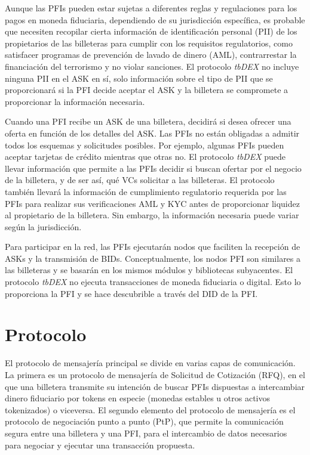 \documentclass[11pt]{article}
\begin{document}
\vspace{1\baselineskip}
Aunque las PFIs pueden estar sujetas a diferentes reglas y regulaciones para los pagos en moneda fiduciaria, dependiendo de su jurisdicción específica, es probable que necesiten recopilar cierta información de identificación personal (PII) de los propietarios de las billeteras para cumplir con los requisitos regulatorios, como satisfacer programas de prevención de lavado de dinero (AML), contrarrestar la financiación del terrorismo y no violar sanciones. El protocolo \textit{tbDEX} no incluye ninguna PII en el ASK en sí, solo información sobre el tipo de PII que se proporcionará si la PFI decide aceptar el ASK y la billetera se compromete a proporcionar la información necesaria.

\vspace{1\baselineskip}
Cuando una PFI recibe un ASK de una billetera, decidirá si desea ofrecer una oferta en función de los detalles del ASK. Las PFIs no están obligadas a admitir todos los esquemas y solicitudes posibles. Por ejemplo, algunas PFIs pueden aceptar tarjetas de crédito mientras que otras no. El protocolo \textit{tbDEX} puede llevar información que permite a las PFIs decidir si buscan ofertar por el negocio de la billetera, y de ser así, qué VCs solicitar a las billeteras. El protocolo también llevará la información de cumplimiento regulatorio requerida por las PFIs para realizar sus verificaciones AML y KYC antes de proporcionar liquidez al propietario de la billetera. Sin embargo, la información necesaria puede variar según la jurisdicción.

\vspace{1\baselineskip}
Para participar en la red, las PFIs ejecutarán nodos que faciliten la recepción de ASKs y la transmisión de BIDs. Conceptualmente, los nodos PFI son similares a las billeteras y se basarán en los mismos módulos y bibliotecas subyacentes. El protocolo \textit{tbDEX} no ejecuta transacciones de moneda fiduciaria o digital. Esto lo proporciona la PFI y se hace descubrible a través del DID de la PFI.

\vspace{1\baselineskip}
\section{Protocolo}

\vspace{1\baselineskip}
El protocolo de mensajería principal se divide en varias capas de comunicación. La primera es un protocolo de mensajería de Solicitud de Cotización (RFQ), en el que una billetera transmite su intención de buscar PFIs dispuestas a intercambiar dinero fiduciario por tokens en especie (monedas estables u otros activos tokenizados) o viceversa. El segundo elemento del protocolo de mensajería es el protocolo de negociación punto a punto (PtP), que permite la comunicación segura entre una billetera y una PFI, para el intercambio de datos necesarios para negociar y ejecutar una transacción propuesta.
\end{document}
